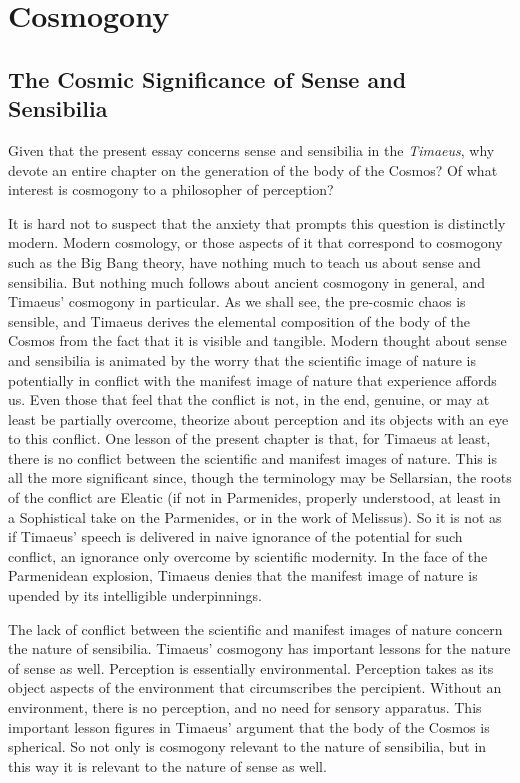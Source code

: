 \chapter{Cosmogony} %
\label{cha:cosmogony}

\section{The Cosmic Significance of Sense and Sensibilia} %
\label{sec:the_cosmic_significance_of_sensibilia}

Given that the present essay concerns sense and sensibilia in the \emph{Timaeus}, why devote an entire chapter on the generation of the body of the Cosmos? Of what interest is cosmogony to a philosopher of perception? 

It is hard not to suspect that the anxiety that prompts this question is distinctly modern. Modern cosmology, or those aspects of it that correspond to cosmogony such as the Big Bang theory, have nothing much to teach us about sense and sensibilia. But nothing much follows about ancient cosmogony in general, and Timaeus' cosmogony in particular. As we shall see, the pre-cosmic chaos is sensible, and Timaeus derives the elemental composition of the body of the Cosmos from the fact that it is visible and tangible. Modern thought about sense and sensibilia is animated by the worry that the scientific image of nature is potentially in conflict with the manifest image of nature that experience affords us. Even those that feel that the conflict is not, in the end, genuine, or may at least be partially overcome, theorize about perception and its objects with an eye to this conflict. One lesson of the present chapter is that, for Timaeus at least, there is no conflict between the scientific and manifest images of nature. This is all the more significant since, though the terminology may be Sellarsian, the roots of the conflict are Eleatic (if not in Parmenides, properly understood, at least in a Sophistical take on the Parmenides, or in the work of Melissus). So it is not as if Timaeus' speech is delivered in naive ignorance of the potential for such conflict, an ignorance only overcome by scientific modernity. In the face of the Parmenidean explosion, Timaeus denies that the manifest image of nature is upended by its intelligible underpinnings. 

The lack of conflict between the scientific and manifest images of nature concern the nature of sensibilia. Timaeus' cosmogony has important lessons for the nature of sense as well. Perception is essentially environmental. Perception takes as its object aspects of the environment that circumscribes the percipient. Without an environment, there is no perception, and no need for sensory apparatus. This important lesson figures in Timaeus' argument that the body of the Cosmos is spherical. So not only is cosmogony relevant to the nature of sensibilia, but in this way it is relevant to the nature of sense as well.

